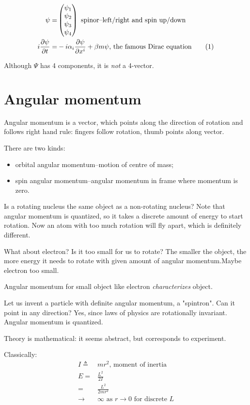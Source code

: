 \documentclass[]{article}
\newcommand\numberthis{\addtocounter{equation}{1}\tag{\theequation}}
\begin{document}
\begin{align*}
	\psi =& \begin{pmatrix}
		\psi_1\\
		\psi_2\\
		\psi_3\\
		\psi_4
	\end{pmatrix} \text{ spinor--left/right and spin up/down}\\
	i \frac{\partial \psi}{\partial t} =& -i \alpha_i \frac{\partial \psi}{\partial x^i} + \beta m \psi \text{, the famous Dirac equation} \numberthis \label{eq:famous:dirac}
\end{align*}

Although $\Psi$ has 4 components, it is \emph{not} a 4-vector.
\section{Angular momentum}

Angular momentum is a vector, which points along the direction of rotation and follows right hand rule: fingers follow rotation, thumb points along vector.

There are two kinds:
\begin{itemize}
	\item orbital angular momentum--motion of centre of mass;
	\item spin angular momentum--angular momentum in frame where momentum is zero.
\end{itemize}

Is a rotating nucleus the same object as a non-rotating nucleus? Note that angular momentum is quantized, so it takes a discrete amount of energy to start rotation. Now an atom with too much rotation will fly apart, which is definitely different. 

What about electron? Is it too small for us to rotate? The smaller the object, the more energy it needs to rotate with given amount of angular momentum.Maybe electron too small.

Angular momentum for small object like electron \emph{characterizes} object.

Let us invent a particle with definite angular momentum, a "spintron". Can it point in any direction? Yes, since laws of physics are rotationally invariant. Angular momentum is quantized.

Theory is mathematical: it seems abstract, but corresponds to experiment.

Classically:
\begin{align*}
I\triangleq&mr^2 \text{, moment of inertia}\\
E=&\frac{L^2}{2I}\\
=&\frac{L^2}{2mr^2}\\
\rightarrow &\infty \text{ as } r \rightarrow 0 \text{ for discrete $L$}
\end{align*}
\end{document}
